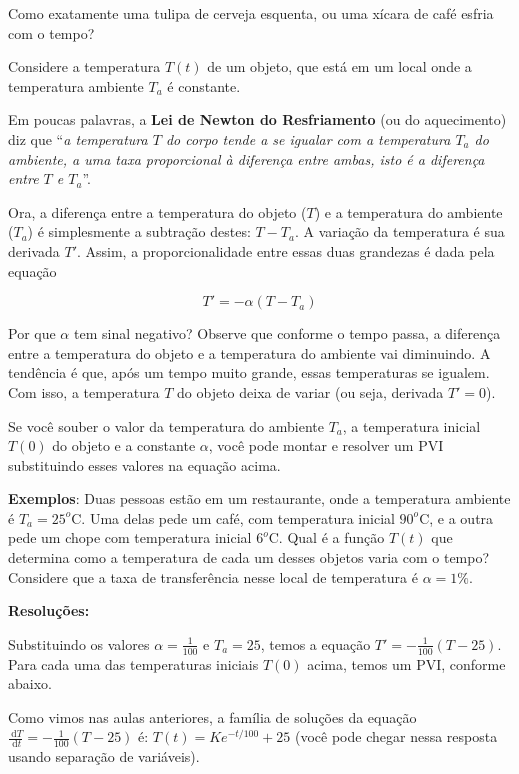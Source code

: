 \documentclass[a4paper]{article}
\newcommand{\ud}{\mathrm{\ d}}
\begin{document}
Como exatamente uma tulipa de cerveja esquenta, ou uma xícara de café
esfria com o tempo?

Considere a temperatura $T(t)$ de um objeto, que está em um local onde
a temperatura ambiente $T_a$ é constante.

Em poucas palavras, a {\bf Lei de Newton do Resfriamento} (ou do
aquecimento) diz que ``{\em a temperatura $T$ do corpo tende a se
  igualar com a temperatura $T_a$ do ambiente, a uma taxa proporcional
  à diferença entre ambas, isto é a diferença entre $T$ e $T_a$}''.

Ora, a diferença entre a temperatura do objeto ($T$) e a temperatura
do ambiente ($T_a$) é simplesmente a subtração destes: $T - T_a$. A
variação da temperatura é sua derivada $T'$. Assim, a
proporcionalidade entre essas duas grandezas é dada pela equação

\begin{displaymath}
  T' = -\alpha(T-T_a)
\end{displaymath}

Por que $\alpha$ tem sinal negativo? Observe que conforme o tempo passa, a
diferença entre a temperatura do objeto e a temperatura do ambiente
vai diminuindo. A tendência é que, após um tempo muito grande, essas
temperaturas se igualem. Com isso, a temperatura $T$ do objeto deixa
de variar (ou seja, derivada $T'=0$).

Se você souber o valor da temperatura do ambiente $T_a$, a temperatura
inicial $T(0)$ do objeto e a constante $\alpha$, você pode montar e
resolver um PVI substituindo esses valores na equação acima.

{\bf Exemplos}: Duas pessoas estão em um restaurante, onde a
temperatura ambiente é $T_a=25^o$C. Uma delas pede um café, com
temperatura inicial $90^o$C, e a outra pede um chope com temperatura
inicial $6^o$C. Qual é a função $T(t)$ que determina como a
temperatura de cada um desses objetos varia com o tempo? Considere que
a taxa de transferência nesse local de temperatura é $\alpha=1\%$.

{\bf Resoluções:}

Substituindo os valores $\alpha=\frac{1}{100}$ e $T_a=25$, temos a
equação $T'=-\frac{1}{100}(T-25)$. Para cada uma das temperaturas
iniciais $T(0)$ acima, temos um PVI, conforme abaixo.

Como vimos nas aulas anteriores, a família de soluções da equação
$\frac{\ud T}{\ud t}=-\frac{1}{100}(T-25)$ é: $T(t)=Ke^{-t/100}+25$
(você pode chegar nessa resposta usando separação de variáveis).
\end{document}
